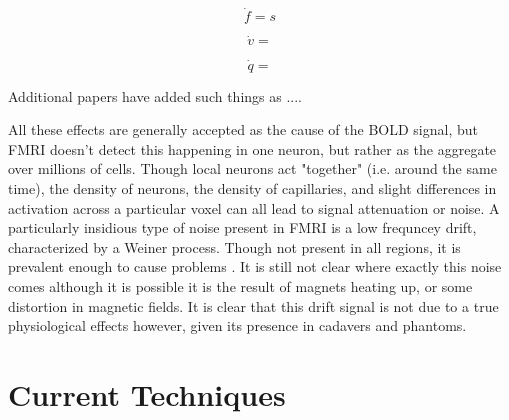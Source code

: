 \documentclass{article}
\begin{document}
\begin{equation}
\dot{f} = s
\end{equation}

\begin{equation}
\dot{v} = 
\end{equation}

\begin{equation}
\dot{q} = 
\end{equation}

Additional papers have added such things as
....

All these effects are generally accepted as the cause of the BOLD signal, 
but FMRI doesn't detect this happening in one neuron, but rather as the 
aggregate over millions of cells. Though local neurons act
"together" (i.e. around the same time), the density of neurons, the
density of capillaries, and slight differences in activation across 
a particular voxel can all lead to signal attenuation or noise. 
A particularly insidious type of noise present in FMRI is a low frequncey
drift, characterized by a Weiner process. Though not present in all
regions, it is prevalent enough to cause problems \cite{detrend}. It is still not
clear where exactly this noise comes although it is possible it is 
the result of magnets heating up, or some distortion in magnetic
fields. It is clear that this drift signal is not due to a true physiological
effects however, given its presence in cadavers and phantoms\cite{drift}.

\section{Current Techniques}
\end{document}

